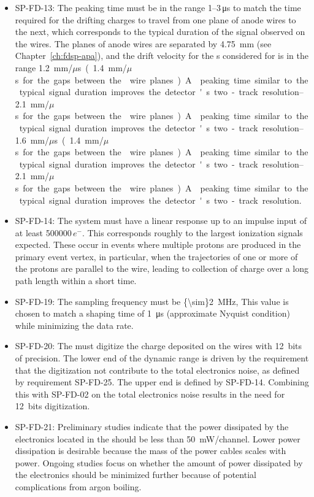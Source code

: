 \begin{itemize}
\item SP-FD-13: The  peaking time must be in the range \numrange{1}{3}\,\si{\micro\second} 
to match the time required for the drifting charges to travel from one plane of anode
wires to the next, which corresponds to the typical duration of the signal observed
on the wires. The planes of anode wires are separated by \SI{4.75}{mm} 
(see Chapter~\ref{ch:fdsp-apa}), and the drift velocity for the \efield{}s 
considered for  is in the range \SIrange{1.2}{1.6}{mm/$\mu$s}
(\SIrange{1.4}{2.1}{mm/$\mu$s} for the gaps between the  wire planes).
A  peaking time  similar to the typical signal duration improves the 
detector's two-track resolution.  

\item SP-FD-14: The system must have a linear response up to an impulse input of 
at least \num{500000}\,$e^{-}$.  This corresponds roughly to the largest 
ionization signals expected. These occur in events where multiple protons are produced 
in the primary event vertex, in particular, when the trajectories of one 
or more of the protons are parallel to the wire, 
leading to collection of charge over a long path length within a short time.

\item SP-FD-19:  The  sampling frequency must be \SI{{\sim}2}{MHz},
This value is chosen to match a  shaping time of \SI{1}{\micro\second} 
(approximate Nyquist condition) while minimizing the data rate.

\item SP-FD-20: The  must digitize the charge deposited on the wires 
with 12~bits of precision.  The lower end of the  dynamic 
range is driven by the requirement that the digitization not contribute 
to the total electronics noise, as defined by requirement SP-FD-25. The upper end
is defined by SP-FD-14. Combining this with SP-FD-02 on the total electronics noise 
results in the need for 12~bits digitization. 

\item SP-FD-21: Preliminary studies indicate that the power dissipated by the 
electronics located in the  should be less than \SI{50}{mW/channel}. 
Lower power dissipation is desirable because the mass of the power cables scales 
with power. Ongoing studies focus on whether the amount of power dissipated by 
the electronics should be minimized further because of potential complications from 
argon boiling. 


\end{itemize}
